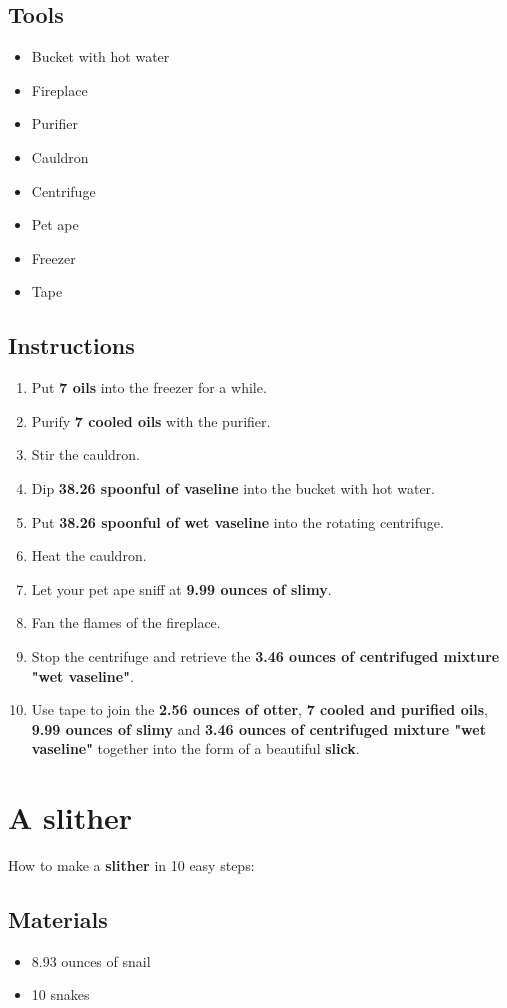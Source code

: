 \documentclass{article}
\begin{document}
\subsection{Tools}\begin{itemize}
\item 
Bucket with hot water
\item 
Fireplace
\item 
Purifier
\item 
Cauldron
\item 
Centrifuge
\item 
Pet ape
\item 
Freezer
\item 
Tape
\end{itemize}
\subsection{Instructions}\begin{enumerate}
\item 
Put \textbf{7 oils} into the freezer for a while.
\item 
Purify \textbf{7 cooled oils} with the purifier.
\item 
Stir the cauldron.
\item 
Dip \textbf{38.26 spoonful of vaseline} into the bucket with hot water.
\item 
Put \textbf{38.26 spoonful of wet vaseline} into the rotating centrifuge.
\item 
Heat the cauldron.
\item 
Let your pet ape sniff at \textbf{9.99 ounces of slimy}.
\item 
Fan the flames of the fireplace.
\item 
Stop the centrifuge and retrieve the \textbf{3.46 ounces of centrifuged mixture "wet vaseline"}.
\item 
Use tape to join the \textbf{2.56 ounces of otter}, \textbf{7 cooled and purified oils}, \textbf{9.99 ounces of slimy} and \textbf{3.46 ounces of centrifuged mixture "wet vaseline"} together into the form of a beautiful \textbf{slick}.
\end{enumerate}
\newpage
\section{A slither}How to make a \textbf{slither} in 10 easy steps:

\subsection{Materials}\begin{itemize}
\item 
8.93 ounces of snail
\item 
10 snakes
\end{itemize}
\end{document}

